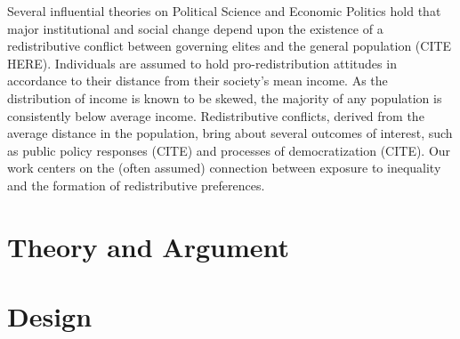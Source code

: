 \documentclass[
	article,
	12pt,
	oneside,
	a4paper,
	oneside,
	english,
	doc
	]{apa6}
\begin{document}
Several influential theories on Political Science and Economic Politics hold that major institutional and social change depend upon the existence of a redistributive conflict between governing elites and the general population (CITE HERE). Individuals are assumed to hold pro-redistribution attitudes in accordance to their distance from their society's mean income. As the distribution of income is known to be skewed, the majority of any population is consistently below average income. Redistributive conflicts, derived from the average distance in the population, bring about several outcomes of interest, such as public policy responses (CITE) and processes of democratization (CITE). Our work centers on the (often assumed) connection between exposure to inequality and the formation of redistributive preferences. 

\section{Theory and Argument}



\section{Design}


\printbibliography
\end{document}
